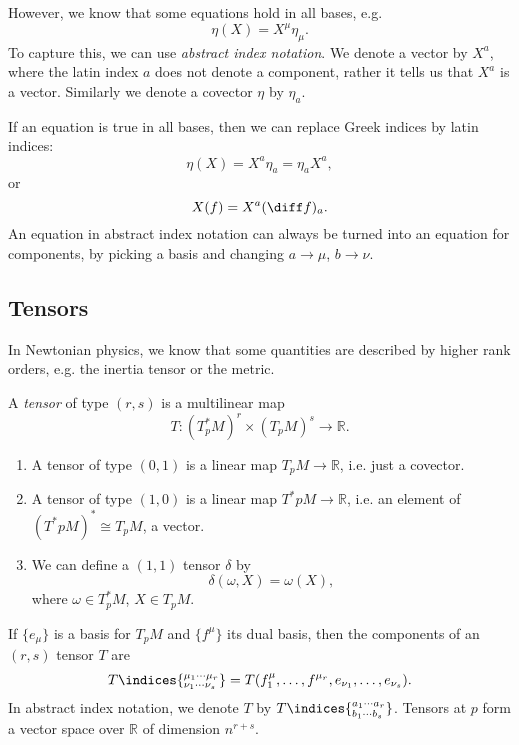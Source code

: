 \documentclass[12pt]{article}
\begin{document}
However, we know that some equations hold in all bases, e.g.
\[
\eta(X) = X^\mu \eta_\mu.
\]
To capture this, we can use \emph{abstract index notation}. We denote a vector by $X^a$, where the latin index $a$ does not denote a component, rather it tells us that $X^a$ is a vector. Similarly we denote a covector $\eta$ by $\eta_a$.

If an equation is true in all bases, then we can replace Greek indices by latin indices:
\[
\eta(X) = X^a \eta_a = \eta_a X^a,
\]
or
\[
X(f) = X^a (\diff f)_a.
\]
An equation in abstract index notation can always be turned into an equation for components, by picking a basis and changing $a \to \mu$, $b \to \nu$.

\subsection{Tensors}%
\label{sub:tens}

In Newtonian physics, we know that some quantities are described by higher rank orders, e.g. the inertia tensor or the metric.

\begin{definition}
	A \emph{tensor} of type $(r, s)$ is a multilinear map
	\[
		T : (T^\ast_p M)^r \times (T_p M)^s \to \mathbb{R}.
	\]
\end{definition}

\begin{exbox}
	\begin{enumerate}
		\item A tensor of type $(0, 1)$ is a linear map $T_p M \to \mathbb{R}$, i.e. just a covector.
		\item A tensor of type $(1, 0)$ is a linear map $T^\ast p M \to \mathbb{R}$, i.e. an element of $(T^\ast p M)^\ast \cong T_p M$, a vector.
		\item We can define a $(1, 1)$ tensor $\delta$ by
			\[
			\delta(\omega, X) = \omega(X),
			\]
		where $\omega \in T_p^\ast M$, $X \in T_p M$.
	\end{enumerate}
\end{exbox}

If $\{e_\mu\}$ is a basis for $T_p M$ and $\{f^\mu\}$ its dual basis, then the components of an $(r, s)$ tensor $T$ are
\[
T\indices{^{\mu_1 \cdots \mu_r}_{\nu_1 \cdots \nu_s}} = T(f^\mu_1, \ldots, f^{\mu_r}, e_{\nu_1}, \ldots, e_{\nu_s}).
\]
In abstract index notation, we denote $T$ by $T\indices{^{a_1 \cdots a_r}_{b_1 \cdots b_s}}$. Tensors at $p$ form a vector space over $\mathbb{R}$ of dimension $n^{r + s}$.
\end{document}
